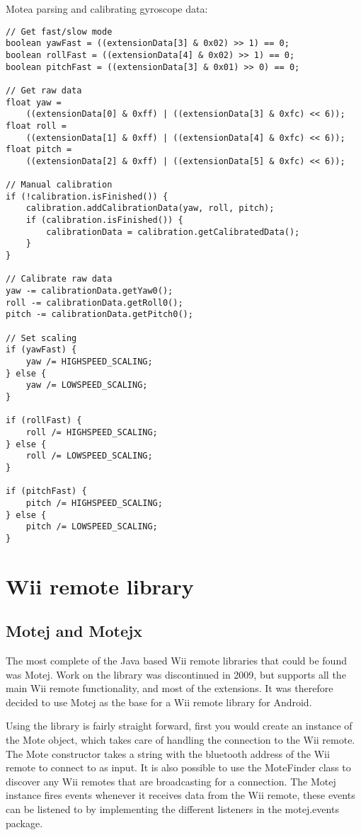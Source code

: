 Motea parsing and calibrating gyroscope data:
\begin{lstlisting}
// Get fast/slow mode
boolean yawFast = ((extensionData[3] & 0x02) >> 1) == 0;
boolean rollFast = ((extensionData[4] & 0x02) >> 1) == 0;
boolean pitchFast = ((extensionData[3] & 0x01) >> 0) == 0;

// Get raw data
float yaw = 
	((extensionData[0] & 0xff) | ((extensionData[3] & 0xfc) << 6));
float roll = 
	((extensionData[1] & 0xff) | ((extensionData[4] & 0xfc) << 6));
float pitch = 
	((extensionData[2] & 0xff) | ((extensionData[5] & 0xfc) << 6));

// Manual calibration
if (!calibration.isFinished()) {
	calibration.addCalibrationData(yaw, roll, pitch);
	if (calibration.isFinished()) {
		calibrationData = calibration.getCalibratedData();
	}
}

// Calibrate raw data
yaw -= calibrationData.getYaw0();
roll -= calibrationData.getRoll0();
pitch -= calibrationData.getPitch0();

// Set scaling
if (yawFast) {
	yaw /= HIGHSPEED_SCALING;
} else {
	yaw /= LOWSPEED_SCALING;
}

if (rollFast) {
	roll /= HIGHSPEED_SCALING;
} else {
	roll /= LOWSPEED_SCALING;
}

if (pitchFast) {
	pitch /= HIGHSPEED_SCALING;
} else {
	pitch /= LOWSPEED_SCALING;
}
\end{lstlisting}
\section{Wii remote library}
\subsection{Motej and Motejx}
The most complete of the Java based Wii remote libraries that could be found was Motej. Work on the library was discontinued in 2009, but supports all the main Wii remote functionality, and most of the extensions. It was therefore decided to use Motej as the base for a Wii remote library for Android. 

Using the library is fairly straight forward, first you would create an instance of the Mote object, which takes care of handling the connection to the Wii remote. The Mote constructor takes a string with the bluetooth address of the Wii remote to connect to as input. It is also possible to use the MoteFinder class to discover any Wii remotes that are broadcasting for a connection. The Motej instance fires events whenever it receives data from the Wii remote, these events can be listened to by implementing the different listeners in the motej.events package. 

